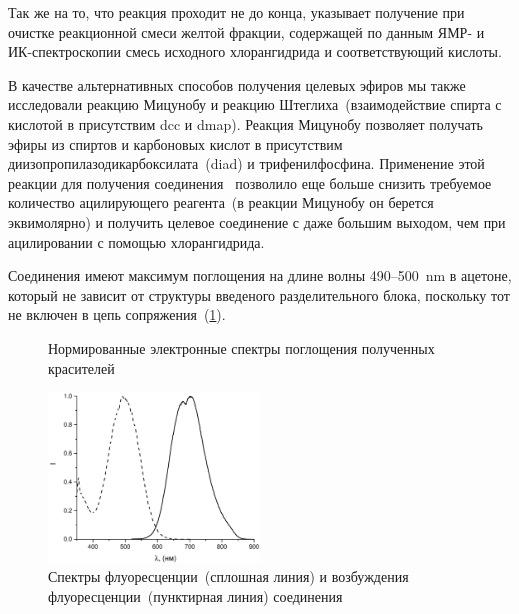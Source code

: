 Так же на то, что реакция проходит не до конца, указывает получение при очистке реакционной смеси желтой фракции, содержащей по данным ЯМР- и ИК-спектроскопии смесь исходного хлорангидрида и соответствующий кислоты.

В качестве альтернативных способов получения целевых эфиров мы также исследовали реакцию Мицунобу и реакцию Штеглиха~(взаимодействие спирта с кислотой в присутствим \ac{dcc} и \ac{dmap}). Реакция Мицунобу позволяет получать эфиры из спиртов и карбоновых кислот в присутствим диизопропилазодикарбоксилата~(\ac{diad}) и трифенилфосфина. Применение этой реакции для получения соединения~ позволило еще больше снизить требуемое количество ацилирующего реагента~(в реакции Мицунобу он берется эквимолярно) и получить целевое соединение с даже большим выходом, чем при ацилировании с помощью хлорангидрида.

Соединения имеют максимум поглощения на длине волны 490--\SI{500}{\nano\metre} в ацетоне, который не зависит от структуры введеного разделительного блока, поскольку тот не включен в цепь сопряжения~(\ref{fig:1OH-UV}).
\begin{figure}[h!]
    \centering
    \caption{Нормированные электронные спектры поглощения полученных красителей}
    \label{fig:1OH-UV}
\end{figure}

\begin{figure}[h!]
    \centering
    \includegraphics[width = 0.5\textwidth]{sections/results/img/Graph3 - Copy.pdf}
    \caption{Спектры флуоресценции~(сплошная линия) и возбуждения флуоресценции~(пунктирная линия) соединения~}
\end{figure} 

